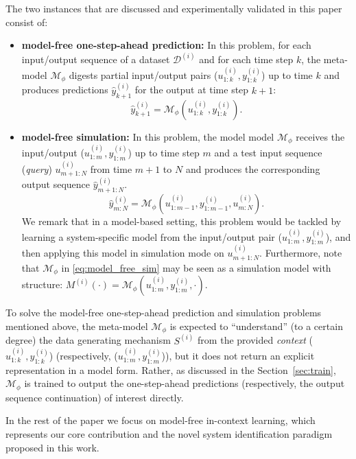 \documentclass{article}
\newcommand{\sys}{S}
\newcommand{\free}{\mathcal{M}}
\newcommand{\D}{\mathcal{D}}
\begin{document}
The two instances that are discussed and experimentally validated in this paper consist of:
\begin{itemize}
    \item \textbf{model-free one-step-ahead prediction:}  In this problem, for each input/output sequence of a dataset $\D^{(i)}$ and for each time step $k$, the meta-model $\free_{\phi}$ digests partial input/output pairs ($u_{1:k}^{(i)}, y_{1:k}^{(i)}$) up to time $k$ and produces predictions $\hat y_{k+1}^{(i)}$ for the output at time step $k+1$:
\begin{equation}
\label{eq:meta_one_step}
\hat y_{k+1}^{(i)} = \free_\phi(u_{1:k}^{(i)}, y_{1:k}^{(i)}).
\end{equation}
%
\item \textbf{model-free simulation:} In this problem, the model model $\free_{\phi}$ receives the input/output  ($u_{1:m}^{(i)}, y_{1:m}^{(i)}$) up to time step $m$
and a test input sequence (\emph{query})  $u_{m+1:N}^{(i)}$ from time $m+1$ to $N$ and produces the corresponding output sequence 
$\hat y_{m+1:N}^{(i)}$. 
\begin{equation}
\label{eq:model_free_sim}
\hat y_{m:N}^{(i)} = \free_\phi(u_{1:m-1}^{(i)}, y_{1:m-1}^{(i)}, u_{m:N}^{(i)}).
\end{equation}
We remark that in a model-based setting, this problem would be tackled by learning a system-specific model from the input/output pair ($u_{1:m}^{(i)}, y_{1:m}^{(i)}$), and then applying this model in simulation mode on $u_{m+1:N}^{(i)}$. Furthermore, note that $\free_\phi$ in \eqref{eq:model_free_sim} may be seen as a simulation model with structure:
$M^{(i)}(\cdot) 
= \free_\phi(u_{1:m}^{(i)}, y_{1:m}^{(i)}, \cdot)$.
\end{itemize}



 To solve the model-free one-step-ahead prediction and simulation problems mentioned above, the meta-model $ \free_\phi$ is expected to ``understand'' (to a certain degree) the data generating mechanism $\sys^{(i)}$ from the provided \emph{context} ($u_{1:k}^{(i)}, y_{1:k}^{(i)}$) (respectively, ($u_{1:m}^{(i)}, y_{1:m}^{(i)}$)), but it does not return an explicit representation in a model form. Rather, as discussed in the  Section~\ref{sec:train}, $\free_\phi$  is trained to output the one-step-ahead predictions (respectively, the output sequence continuation) of interest directly.

 
 In the rest of the paper  we focus  on model-free in-context learning, which represents our core contribution and the novel system identification paradigm proposed in this work. 
\end{document}
